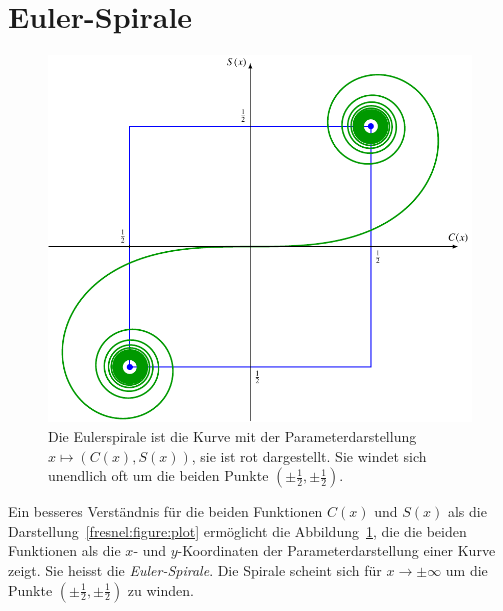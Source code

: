%
%
%
\section{Euler-Spirale
\label{fresnel:section:eulerspirale}}
\begin{figure}
\centering
\includegraphics{papers/fresnel/eulerspirale.pdf}
\caption{Die Eulerspirale ist die Kurve mit der Parameterdarstellung
$x\mapsto (C(x),S(x))$, sie ist rot dargestellt.
Sie windet sich unendlich oft um die beiden Punkte $(\pm\frac12,\pm\frac12)$.
\label{fresnel:figure:eulerspirale}}
\end{figure}
Ein besseres Verständnis für die beiden Funktionen $C(x)$ und $S(x)$
als die Darstellung~\ref{fresnel:figure:plot} ermöglicht die
Abbildung~\ref{fresnel:figure:eulerspirale}, die die beiden Funktionen
als die $x$- und $y$-Koordinaten der Parameterdarstellung einer Kurve
zeigt.
Sie heisst die {\em Euler-Spirale}.
Die Spirale scheint sich für $x\to\pm\infty$ um die Punkte
$(\pm\frac12,\pm\frac12)$ zu winden.

